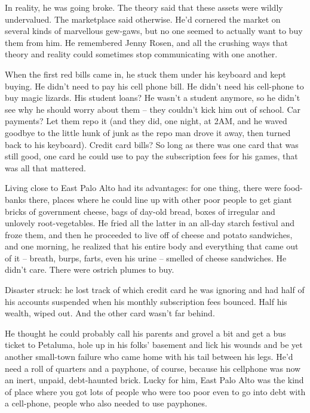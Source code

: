 In reality, he was going broke. The theory said that these assets
were wildly undervalued. The marketplace said otherwise. He'd
cornered the market on several kinds of marvellous gew-gaws, but no
one seemed to actually want to buy them from him. He remembered
Jenny Rosen, and all the crushing ways that theory and reality
could sometimes stop communicating with one another.

When the first red bills came in, he stuck them under his keyboard
and kept buying. He didn't need to pay his cell phone bill. He
didn't need his cell-phone to buy magic lizards. His student loans?
He wasn't a student anymore, so he didn't see why he should worry
about them -- they couldn't kick him out of school. Car payments?
Let them repo it (and they did, one night, at 2AM, and he waved
goodbye to the little hunk of junk as the repo man drove it away,
then turned back to his keyboard). Credit card bills? So long as
there was one card that was still good, one card he could use to
pay the subscription fees for his games, that was all that
mattered.

Living close to East Palo Alto had its advantages: for one thing,
there were food-banks there, places where he could line up with
other poor people to get giant bricks of government cheese, bags of
day-old bread, boxes of irregular and unlovely root-vegetables. He
fried all the latter in an all-day starch festival and froze them,
and then he proceeded to live off of cheese and potato sandwiches,
and one morning, he realized that his entire body and everything
that came out of it -- breath, burps, farts, even his urine --
smelled of cheese sandwiches. He didn't care. There were ostrich
plumes to buy.

Disaster struck: he lost track of which credit card he was ignoring
and had half of his accounts suspended when his monthly
subscription fees bounced. Half his wealth, wiped out. And the
other card wasn't far behind.

He thought he could probably call his parents and grovel a bit and
get a bus ticket to Petaluma, hole up in his folks' basement and
lick his wounds and be yet another small-town failure who came home
with his tail between his legs. He'd need a roll of quarters and a
payphone, of course, because his cellphone was now an inert,
unpaid, debt-haunted brick. Lucky for him, East Palo Alto was the
kind of place where you got lots of people who were too poor even
to go into debt with a cell-phone, people who also needed to use
payphones.

